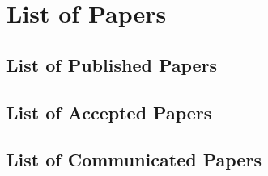 \appendix
\chapter{List of Papers}
\section{List of Published Papers}
\section{List of Accepted Papers}
\section{List of Communicated Papers}